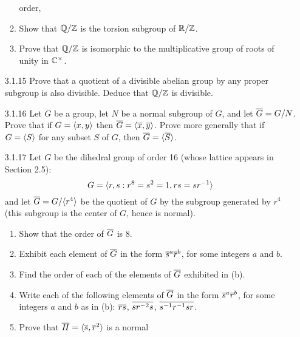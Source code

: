 \begin{enumerate}
\begin{enumerate}
                           order,
                     \item Show that $\mathbb{Q}/\mathbb{Z}$ is the torsion subgroup of $\mathbb{R}/\mathbb{Z}$.
                     \item Prove that $\mathbb{Q}/\mathbb{Z}$ is isomorphic to the
                           multiplicative group of roots of unity in
                           $\mathbb{C}^\times$.
                  \end{enumerate}
   \item[3.1.15]  Prove that a quotient of a divisible abelian group by any
                  proper subgroup is also divisible. Deduce that $\mathbb{Q}/\mathbb{Z}$ is
                  divisible.
   \item[3.1.16]  Let $G$ be a group, let $N$ be a normal subgroup of $G$, and
                  let $\overline{G} = G/N$. Prove that if $G = \langle x, y \rangle$ then
                  $\overline{G} = \langle \overline{x}, \overline{y} \rangle$. Prove more generally that if
                  $G =\langle S \rangle$ for any subset $S$ of $G$, then
                  $\overline{G} = \langle \overline{S} \rangle$.
   \item[3.1.17]  Let $G$ be the dihedral group of order 16 (whose lattice
                  appears in Section 2.5):
                  $$G = \langle r, s : r^8 = s^2 = 1, rs = sr^{-1} \rangle$$
                  and let $\overline{G} = G/\langle r^4 \rangle$ be the quotient of $G$ by
                  the subgroup generated by $r^4$ (this subgroup is the center
                  of $G$, hence is normal).
                  \begin{enumerate}
                     \item Show that the order of $\overline{G}$ is 8.
                     \item Exhibit each element of $\overline{G}$ in the form
                           $\overline{s}^a\overline{r}^b$, for some integers $a$ and $b$.
                     \item Find the order of each of the elements of
                           $\overline{G}$ exhibited in (b).
                     \item Write each of the following elements of $\overline{G}$ in
                           the form $\overline{s}^a\overline{r}^b$, for some integers $a$ and
                           $b$ as in (b): \quad $\overline{rs}$, \quad $\overline{sr^{-2}s}$,
                           \quad $\overline{s^{-1}r^{-1}sr}$.
                     \item Prove that $\overline{H} = \langle \overline{s}, \overline{r}^2 \rangle$ is a normal

\end{enumerate}
\end{enumerate}
